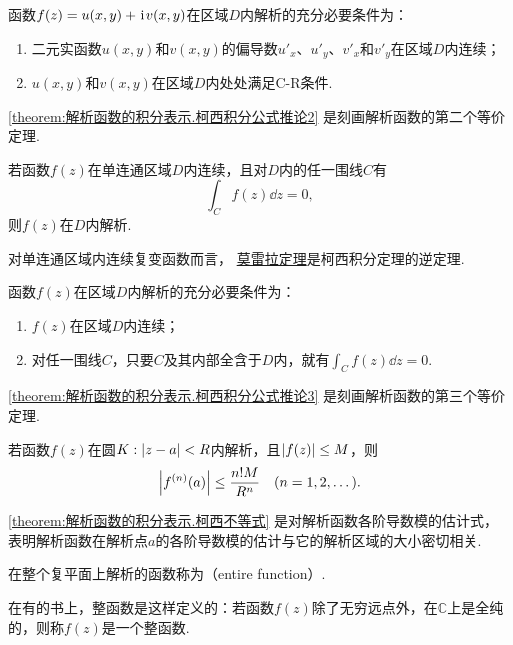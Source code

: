 \begin{corollary}\label{theorem:解析函数的积分表示.柯西积分公式推论2}
函数\(f(z)=u(x,y)+\kern1pt\mathrm{i}\kern1pt v(x,y)\)在区域\(D\)内解析的充分必要条件为：
\begin{enumerate}
\item 二元实函数\(u(x,y)\)和\(v(x,y)\)的偏导数\(u'_x\)、\(u'_y\)、\(v'_x\)和\(v'_y\)在区域\(D\)内连续；
\item \(u(x,y)\)和\(v(x,y)\)在区域\(D\)内处处满足C-R条件.
\end{enumerate}
\end{corollary}
\cref{theorem:解析函数的积分表示.柯西积分公式推论2} 是刻画解析函数的第二个等价定理.

\begin{theorem}[莫雷拉定理]\label{theorem:解析函数的积分表示.莫雷拉定理}
若函数\(f(z)\)在单连通区域\(D\)内连续，且对\(D\)内的任一围线\(C\)有\[
\int_C f(z) \dd{z} = 0,
\]则\(f(z)\)在\(D\)内解析.
\end{theorem}
对单连通区域内连续复变函数而言，
\hyperref[theorem:解析函数的积分表示.莫雷拉定理]{莫雷拉定理}是柯西积分定理的逆定理.

\begin{theorem}\label{theorem:解析函数的积分表示.柯西积分公式推论3}
函数\(f(z)\)在区域\(D\)内解析的充分必要条件为：
\begin{enumerate}
\item \(f(z)\)在区域\(D\)内连续；
\item 对任一围线\(C\)，只要\(C\)及其内部全含于\(D\)内，就有\(\int_C f(z) \dd{z} = 0\).
\end{enumerate}
\end{theorem}
\cref{theorem:解析函数的积分表示.柯西积分公式推论3} 是刻画解析函数的第三个等价定理.

\begin{theorem}[柯西不等式]
若函数\(f(z)\)在圆\(K: \abs{z-a}<R\)内解析，且\(\abs{f(z)} \leq M\)，则\begin{equation}\label{theorem:解析函数的积分表示.柯西不等式}
\abs{f^{(n)}(a)} \leq \frac{n! M}{R^n}
\quad(n=1,2,\dots).
\end{equation}
\end{theorem}
\cref{theorem:解析函数的积分表示.柯西不等式} 是对解析函数各阶导数模的估计式，表明解析函数在解析点\(a\)的各阶导数模的估计与它的解析区域的大小密切相关.

\begin{definition}
在整个复平面上解析的函数称为（entire function）.
\end{definition}
在有的书上，整函数是这样定义的：若函数\(f(z)\)除了无穷远点外，在\(\mathbb{C}\)上是全纯的，则称\(f(z)\)是一个整函数.

